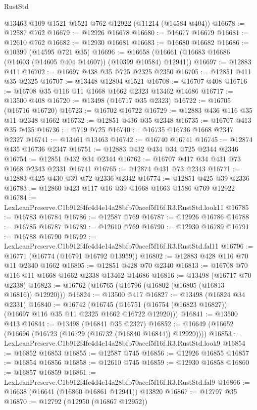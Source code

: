 \begin{lexlean}{RustStd}
\begin{coremodule}
    @13463
    @109
    @1521
    @1521
    @762
    @12922
    (@11214 (@14584 @404))
@16678 := @12587 @762
@16679 := @12926 @16678
@16680 := @16677 @16679
@16681 := @12610 @762
@16682 := @12930 @16681
@16683 := @16680 @16682
@16686 := @10399 (@14595 @721 @35)
@16696 := @16658 (@16661 (@16683 @16686 (@14603 (@14605 @404 @14607)) (@10399 @10584) @12941))
@16697 := @12883 @411
@16702 := @16697 @438 @35 @725 @2325 @2350
@16705 := @12851 @411 @35 @2325
@16707 := @13448 @12804 @1521
@16708 := @16707 @408
@16716 := @16708 @35 @116 @11 @1668 @1662 @2323 @13462 @14686
@16717 := @13500 @408
@16720 := @13498 (@16717 @35 @2323)
@16722 := @16705 (@16716 @16720)
@16723 := @16702 @16722
@16729 := @12883 @436 @116 @35 @11 @2348 @1662
@16732 := @12851 @436 @35 @2348
@16735 := @16707 @413 @35 @435
@16736 := @719 @725
@16740 := @16735 @16736 @1668 @2347 @2327
@16741 := @13461 @13463
@16742 := @16740 @16741
@16745 := @12874 @435 @16736 @2347
@16751 := @12883 @432 @434 @34 @725 @2344 @2346
@16754 := @12851 @432 @34 @2344
@16762 := @16707 @417 @34 @431 @73 @1668 @2343 @2331 @16741
@16765 := @12874 @431 @73 @2343
@16771 := @12883 @425 @430 @39 @72 @2336 @2342
@16774 := @12851 @425 @39 @2336
@16783 := @12860 @423 @117 @16 @39 @1668 @1663 @1586 @769 @12922
@16784 := LexLeanPreserve.C1b912f4fc4d4e14a28bfb70aeef5f16f.R3.RustStd.look11
@16785 := @16783 @16784
@16786 := @12587 @769
@16787 := @12926 @16786
@16788 := @16785 @16787
@16789 := @12610 @769
@16790 := @12930 @16789
@16791 := @16788 @16790
@16792 := LexLeanPreserve.C1b912f4fc4d4e14a28bfb70aeef5f16f.R3.RustStd.fal11
@16796 := @16771 (@16774 (@16791 @16792 @13959))
@16802 := @12883 @428 @116 @70 @11 @2340 @1662
@16805 := @12851 @428 @70 @2340
@16813 := @16708 @70 @116 @11 @1668 @1662 @2338 @13462 @14686
@16816 := @13498 (@16717 @70 @2338)
@16823 := @16762 (@16765 (@16796 (@16802 (@16805 (@16813 @16816)) @12920)))
@16824 := @13500 @417
@16827 := @13498 (@16824 @34 @2331)
@16840 := @16742
    (@16745 (@16751 (@16754 (@16823 @16827)) (@16697 @116 @35 @11 @2325 @1662 @16722 @12920)))
@16841 := @13500 @413
@16844 := @13498 (@16841 @35 @2327)
@16852 := @16649 (@16652 (@16696 (@16723 (@16729 (@16732 (@16840 @16844)) @12920))))
@16853 := LexLeanPreserve.C1b912f4fc4d4e14a28bfb70aeef5f16f.R3.RustStd.look9
@16854 := @16852 @16853
@16855 := @12587 @745
@16856 := @12926 @16855
@16857 := @16854 @16856
@16858 := @12610 @745
@16859 := @12930 @16858
@16860 := @16857 @16859
@16861 := LexLeanPreserve.C1b912f4fc4d4e14a28bfb70aeef5f16f.R3.RustStd.fal9
@16866 := @16638 (@16641 (@16860 @16861 @12941)) @13820
@16867 := @12797 @35
@16870 := @12792 (@12950 (@16867 @12952))

\end{coremodule}
\end{lexlean}
